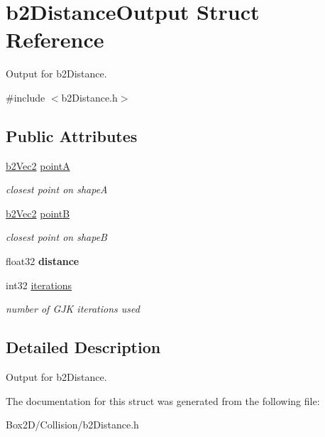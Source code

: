 \hypertarget{structb2_distance_output}{}\section{b2\+Distance\+Output Struct Reference}
\label{structb2_distance_output}


Output for b2\+Distance.  




{\ttfamily \#include $<$b2\+Distance.\+h$>$}

\subsection*{Public Attributes}
\begin{DoxyCompactItemize}
\item 
\mbox{\label{structb2_distance_output_a7e0f1f44a64e596dc7d37570c69eefce}} 
\hyperlink{structb2_vec2}{b2\+Vec2} \hyperlink{structb2_distance_output_a7e0f1f44a64e596dc7d37570c69eefce}{pointA}
\begin{DoxyCompactList}\small\item\em closest point on shapeA \end{DoxyCompactList}\item 
\mbox{\label{structb2_distance_output_aa85beca17337a506cd4a924d0c6f92cc}} 
\hyperlink{structb2_vec2}{b2\+Vec2} \hyperlink{structb2_distance_output_aa85beca17337a506cd4a924d0c6f92cc}{pointB}
\begin{DoxyCompactList}\small\item\em closest point on shapeB \end{DoxyCompactList}\item 
\mbox{\label{structb2_distance_output_ae67f480ff37d4ab732e6366f485c7f55}} 
float32 {\bfseries distance}
\item 
\mbox{\label{structb2_distance_output_ae2d4c84dd3d05ea4f4d20c91099ec8d5}} 
int32 \hyperlink{structb2_distance_output_ae2d4c84dd3d05ea4f4d20c91099ec8d5}{iterations}
\begin{DoxyCompactList}\small\item\em number of G\+JK iterations used \end{DoxyCompactList}\end{DoxyCompactItemize}


\subsection{Detailed Description}
Output for b2\+Distance. 

The documentation for this struct was generated from the following file\+:\begin{DoxyCompactItemize}
\item 
Box2\+D/\+Collision/b2\+Distance.\+h\end{DoxyCompactItemize}
